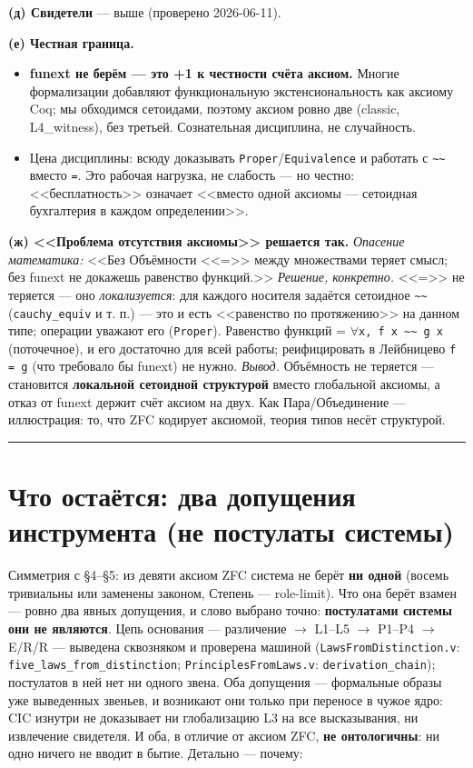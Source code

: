 \documentclass[11pt,a4paper]{article}
\begin{document}
\textbf{(д) Свидетели} --- выше (проверено 2026-06-11).

\textbf{(е) Честная граница.}
\begin{itemize}
\item \textbf{funext не берём --- это +1 к честности счёта аксиом.} Многие формализации добавляют функциональную экстенсиональность как аксиому Coq; мы обходимся сетоидами, поэтому аксиом ровно две (classic, L4\_witness), без третьей. Сознательная дисциплина, не случайность.
\item Цена дисциплины: всюду доказывать \texttt{Proper}/\texttt{Equivalence} и работать с \texttt{\textasciitilde{}\textasciitilde{}} вместо \texttt{=}. Это рабочая нагрузка, не слабость --- но честно: <<бесплатность>> означает <<вместо одной аксиомы --- сетоидная бухгалтерия в каждом определении>>.
\end{itemize}

\textbf{(ж) <<Проблема отсутствия аксиомы>> решается так.} \emph{Опасение математика:} <<Без Объёмности <<=>> между множествами теряет смысл; без funext не докажешь равенство функций.>> \emph{Решение, конкретно.} <<=>> не теряется --- оно \emph{локализуется}: для каждого носителя задаётся сетоидное \texttt{\textasciitilde{}\textasciitilde{}} (\texttt{cauchy\_\allowbreak{}equiv} и т. п.) --- это и есть <<равенство по протяжению>> на данном типе; операции уважают его (\texttt{Proper}). Равенство функций = \texttt{$\forall$x,\allowbreak{} f x \textasciitilde{}\textasciitilde{} g x} (поточечное), и его достаточно для всей работы; реифицировать в Лейбницево \texttt{f = g} (что требовало бы funext) не нужно. \emph{Вывод.} Объёмность не теряется --- становится \textbf{локальной сетоидной структурой} вместо глобальной аксиомы, а отказ от funext держит счёт аксиом на двух. Как Пара/Объединение --- иллюстрация: то, что ZFC кодирует аксиомой, теория типов несёт структурой.

\bigskip\hrule\bigskip

\section{Что остаётся: два допущения инструмента (не постулаты системы)}

Симметрия с \S{}4--\S{}5: из девяти аксиом ZFC система не берёт \textbf{ни одной} (восемь тривиальны или заменены законом, Степень --- role-limit). Что она берёт взамен --- ровно два явных допущения, и слово выбрано точно: \textbf{постулатами системы они не являются}. Цепь основания --- различение $\to$ L1--L5 $\to$ P1--P4 $\to$ E/R/R --- выведена сквозняком и проверена машиной (\texttt{Laws\allowbreak{}From\allowbreak{}Distinction.v}: \texttt{five\_\allowbreak{}laws\_\allowbreak{}from\_\allowbreak{}distinction}; \texttt{Principles\allowbreak{}From\allowbreak{}Laws.v}: \texttt{derivation\_\allowbreak{}chain}); постулатов в ней нет ни одного звена. Оба допущения --- формальные образы уже выведенных звеньев, и возникают они только при переносе в чужое ядро: CIC изнутри не доказывает ни глобализацию L3 на все высказывания, ни извлечение свидетеля. И оба, в отличие от аксиом ZFC, \textbf{не онтологичны}: ни одно ничего не вводит в бытие. Детально --- почему:
\end{document}

